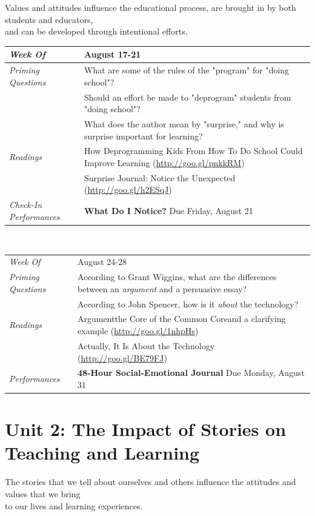 \documentclass[two-side]{tufte-handout}
\newcommand{\gentopic}[1]{\begin{fullwidth}\begin{center}\faKey \textsf{#1}\end{center}\end{fullwidth}}
\newcommand{\tabpq}{\faQuestionCircle\medspace\textit{Priming Questions}}
\newcommand{\tabread}{\faBook\medspace\textit{Readings}}
\newcommand{\tabperformance}{\faTasks\medspace\textit{Performances}}
\newcommand{\tabdt}{\faCalendar\medspace\textit{Week Of}}
\newcommand{\tabcheckin}{\faCheckSquareO\medspace\textit{Check-In Performances}}
\newcommand{\tabbreak}{\begin{fullwidth}\begin{center}\faAsterisk\faAsterisk\faAsterisk\\\end{center}\end{fullwidth}}
\newenvironment{tabsched}
	{\small
	\begin{tabular}{p{1.5in}p{4.5in}}
	\midrule}
	{\midrule
	\end{tabular}
	\normalsize}
\newcommand{\weekone}{August 17-21}
\newcommand{\weektwo}{August 24-28}
\begin{document}
\gentopic{Values and attitudes influence the educational process, are brought in by both students and educators,\\and can be developed through intentional efforts.}


\begin{tabsched}
	\tabdt & \weekone \\
	\midrule
	\tabpq & What are some of the rules of the "program" for "doing school"? \\
	& Should an effort be made to "deprogram" students from "doing school"? \\
	& What does the author mean by "surprise," and why is surprise important for learning? \\
	\midrule
	\tabread & How Deprogramming Kids From How To Do School Could Improve Learning (\url{http://goo.gl/pnkkRM}) \\
	& Surprise Journal: Notice the Unexpected (\url{http://goo.gl/h2ESqJ}) \\
	\midrule
	\tabcheckin & \textbf{What Do I Notice?} Due Friday, August 21 \\
\end{tabsched}

\tabbreak

\begin{tabsched}
	\tabdt & \weektwo \\
	\midure
	\tabpq & According to Grant Wiggins, what are the differences between an \emph{argument} and a persuasive essay? \\
	& According to John Spencer, how is it \emph{about} the technology? \\
	\midrule
	\tabread & Argument\textemdash{}the Core of the Common Core\textemdash{}and a clarifying example (\url{http://goo.gl/1nhpHs}) \\
	& Actually, It Is About the Technology (\url{http://goo.gl/BE79FJ}) \\
	\midrule
	\tabperformance & \textbf{48-Hour Social-Emotional Journal} Due Monday, August 31 \\
\end{tabsched}

	\section{Unit 2: The Impact of Stories on Teaching and Learning}

\gentopic{The stories that we tell about ourselves and others influence the attitudes and values that we bring\\to our lives and learning experiences.}
\end{document}
